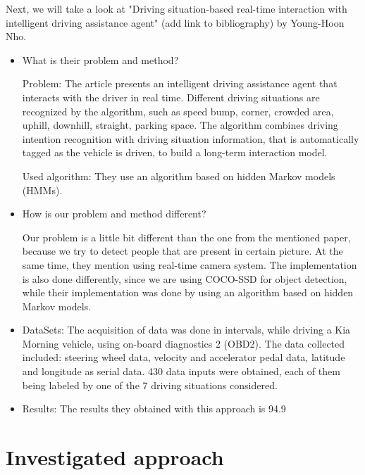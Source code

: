 \documentclass[runningheads,a4paper,11pt]{report}
\begin{document}
    Next, we will take a look at "Driving situation-based real-time interaction with intelligent driving assistance agent" (add link to bibliography) by Young-Hoon Nho.
    \begin{itemize}
	\item What is their problem and method?
	
	Problem: The article presents an intelligent driving assistance agent that interacts with the driver in real time. Different driving situations are recognized by the algorithm, such as speed bump, corner, crowded area, uphill, downhill, straight, parking space. The algorithm combines driving intention recognition with driving situation information, that is automatically tagged as the vehicle is driven, to build a long-term interaction model.
	
	Used algorithm: They use an algorithm based on hidden Markov models (HMMs).
	\item How is our problem and method different? 
	
	Our problem is a little bit different than the one from the mentioned paper, because we try to detect people that are present in certain picture. At the same time, they mention using real-time camera system. The implementation is also done differently, since we are using COCO-SSD for object detection, while their implementation was done by using an algorithm based on hidden Markov models.
	\item DataSets: The acquisition of data was done in intervals, while driving a Kia Morning vehicle, using on-board diagnostics 2 (OBD2). The data collected included: steering wheel data, velocity and accelerator pedal data, latitude and longitude as serial data. 430 data inputs were obtained, each of them being labeled by one of the 7 driving situations considered.
	\item Results: The results they obtained with this approach is 94.9%
    
\end{itemize}



\chapter{Investigated approach}
\label{chapter:proposedApproach}

\end{document}
